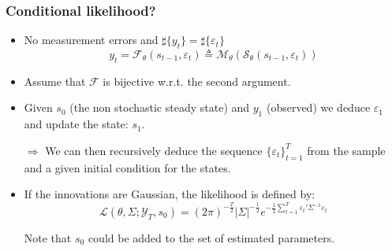 \documentclass[10pt]{beamer}
\begin{document}
\begin{frame}
  \frametitle{Conditional likelihood?}

  \begin{itemize}
  \item No measurement errors and $\sharp\{y_t\}=\sharp\{\varepsilon_t\}$
    \[
      y_t = \mathcal F_\theta \left(s_{t-1}, \varepsilon_t\right) \triangleq \mathcal M_{\theta}\left(\mathcal S_\theta(s_{t-1}, \varepsilon_t)\right)
    \]
    
    \bigskip

  \item Assume that $\mathcal F$ is bijective w.r.t. the second argument.

    \bigskip

  \item Given $s_0$ (the non stochastic steady state) and $y_1$ (observed) we deduce $\varepsilon_1$ and update the state: $s_1$.\newline

    $\Rightarrow$ We can then recursively deduce the sequence $\{\varepsilon_t\}_{t=1}^T$ from the sample and a given initial condition for the states.\newline

    \bigskip

  \item If the innovations are Gaussian, the likelihood is defined by:
    \[
      \mathcal L(\theta, \Sigma; \mathcal Y_T, s_0) = (2\pi)^{-\frac{T}{2}}|\Sigma|^{-\frac{1}{2}}e^{-\frac{1}{2}\sum_{t=1}^T \varepsilon_t'\Sigma^{-1}\varepsilon_t}
    \]

    \bigskip

    Note that $s_0$ could be added to the set of estimated parameters.

  \end{itemize}
\end{frame}
\end{document}
